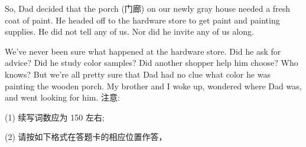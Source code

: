\documentclass{英语试卷}
\begin{document}
\par So, Dad decided that the porch (门廊) on our newly gray house needed a fresh coat of paint. He headed off to the hardware store to get paint and painting supplies. He did not tell any of us. Nor did he invite any of us along.\par
\par We've never been sure what happened at the hardware store. Did he ask for advice? Did he study color samples? Did another shopper help him choose? Who knows? But we're all pretty sure that Dad had no clue what color he was painting the wooden porch. My brother and I woke up, wondered where Dad was, and went looking for him. 注意:\par
\par (1) 续写词数应为 150 左右;\par
\par (2) 请按如下格式在答题卡的相应位置作答，\par
{}
\end{document}
